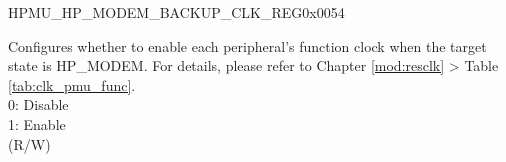 \begin{register}{H}{PMU\_HP\_MODEM\_BACKUP\_CLK\_REG}{0x0054}\label{regdesc:PMUHPMODEMBACKUPCLKREG}
%
\regnewline%
\begin{regdesc}\begin{reglist}
\label{fielddesc:PMUHPMODEMBACKUPICGFUNCEN}\item [PMU\_HP\_MODEM\_BACKUP\_ICG\_FUNC\_EN] Configures whether to enable each peripheral's function clock when the target state is HP\_MODEM. For details, please refer to Chapter \ref{mod:resclk} \textit{} > Table \ref{tab:clk_pmu_func}.\\
0: Disable\\
1: Enable\\
(R/W)

\end{reglist}\end{regdesc}
\end{register}


